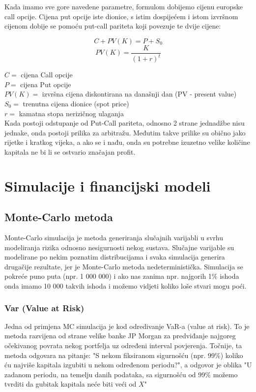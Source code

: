\documentclass[times, utf8, seminar]{fer}
\begin{document}
\noindent Kada imamo sve gore navedene parametre, formulom dobijemo cijenu europske call opcije. Cijena put opcije iste dionice, s istim dospijećem i istom izvršnom cijenom dobije se pomoću put-call pariteta koji povezuje te dvije cijene:

    \[ C + PV(K) = P + S_0 \]
    \[ PV(K) = \frac{K}{(1+r)^t} \]

\noindent $C =$ cijena Call opcije \\
$P =$ cijena Put opcije \\
$PV(K) =$ izvršna cijena diskontirana na današnji dan (PV - present value)\\
$S_0 =$ trenutna cijena dionice (spot price)\\
$r =$ kamatna stopa nerizičnog ulaganja \\

Kada postoji odstupanje od Put-Call pariteta, odnosno 2 strane jednadžbe nisu jednake, onda postoji prilika za arbitražu. Međutim takve prilike su obično jako rijetke i kratkog vijeka, a ako se i nađu, onda su potrebne izuzetno velike količine kapitala ne bi li se ostvario značajan profit.


\chapter{Simulacije i financijski modeli}

\section{Monte-Carlo metoda}
Monte-Carlo simulacija je metoda generiranja slučajnih varijabli u svrhu modeliranja rizika odnosno nesigurnosti nekog sustava. Slučajne varijable su modelirane po nekim poznatim distribucijama i svaka simulacija generira drugačije rezultate, jer je Monte-Carlo metoda nedeterministička. Simulacija se pokreće puno puta (npr. 1 000 000) i ako nas zanima npr. najgorih 1\% ishoda onda imamo 10 000 takvih ishoda i možemo vidjeti koliko loše stvari mogu poći.

\subsection{Var (Value at Risk)}
Jedna od primjena MC simulacija je kod odredivanje VaR-a (value at risk). To je metoda razvijena od strane velike banke JP Morgan za predviđanje najgoreg očekivanog povrata nekog portfelja uz određeni interval povjerenja. Točnije, ta metoda odgovara na pitanje: "S nekom fiksiranom sigurnošću (npr. 99\%) koliko ću najviše kapitala izgubiti u nekom određenom periodu?", a odgovor je oblika "U zadanom periodu, na temelju danih podataka, sa sigurnošću od 99\% možemo tvrditi da gubitak kapitala neće biti veći od $X$"
\end{document}
